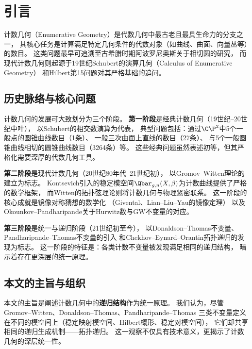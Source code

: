 
\section{引言}\label{sec:intro}

计数几何（Enumerative Geometry）是代数几何中最古老且最具生命力的分支之一，
其核心任务是计算满足特定几何条件的代数对象（如曲线、曲面、向量丛等）的数目。
这类问题最早可追溯至古希腊时期阿波罗尼奥斯关于相切圆的研究，
而现代计数几何则起源于19世纪Schubert的演算几何（Calculus of Enumerative Geometry）
和Hilbert第15问题对其严格基础的追问。

\subsection{历史脉络与核心问题}

计数几何的发展可大致划分为三个阶段。
\textbf{第一阶段}是经典计数几何（19世纪--20世纪中叶），
以Schubert的相交数演算为代表，
典型问题包括：通过$\C\P^2$中5个一般点的圆锥曲线数目（1条）、
一般三次曲面上直线的数目（27条）、
与5个一般圆锥曲线相切的圆锥曲线数目（3264条）等。
这些经典问题虽然表述初等，但其严格化需要深厚的代数几何工具。

\textbf{第二阶段}是现代计数几何（20世纪80年代--21世纪初），
以Gromov--Witten理论的建立为标志。
Kontsevich引入的稳定模空间$\Qbar_{g,n}(X,\beta)$为计数曲线提供了严格的数学框架，
而Witten的拓扑弦理论则将计数几何与物理紧密联系。
这一阶段的核心成就是镜像对称猜想的数学化
（Givental、Lian--Liu--Yau的镜像定理）
以及Okounkov--Pandharipande关于Hurwitz数与GW不变量的对应。

\textbf{第三阶段}是统一与递归阶段（21世纪初至今），
以Donaldson--Thomas不变量、Pandharipande--Thomas不变量的引入
和Chekhov--Eynard--Orantin拓扑递归的发现为标志。
这一阶段的特征是：各类计数不变量被发现满足相同的递归结构，
暗示着存在更深层的统一原理。

\subsection{本文的主旨与组织}

本文的主旨是阐述计数几何中的\textbf{递归结构}作为统一原理。
我们认为，尽管Gromov--Witten、Donaldson--Thomas、Pandharipande--Thomas
三类不变量定义在不同的模空间上（稳定映射模空间、Hilbert概形、稳定对模空间），
它们却共享相同的递归生成机制——拓扑递归。
这一观察不仅具有技术意义，更揭示了计数几何的深层统一性。

